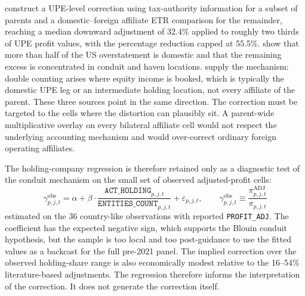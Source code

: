 \documentclass[11pt,a4paper]{article}
\newcommand{\code}[1]{\texttt{#1}}
\begin{document}
\citet{hugger2026} construct a UPE-level correction using tax-authority information for a subset of parents and a domestic--foreign affiliate ETR comparison for the remainder, reaching a median downward adjustment of 32.4\% applied to roughly two thirds of UPE profit values, with the percentage reduction capped at 55.5\%. \citet{garcia-bernardo2022a} show that more than half of the US overstatement is domestic and that the remaining excess is concentrated in conduit and haven locations. \citet{blouin2023} supply the mechanism: double counting arises where equity income is booked, which is typically the domestic UPE leg or an intermediate holding location, not every affiliate of the parent. These three sources point in the same direction. The correction must be targeted to the cells where the distortion can plausibly sit. A parent-wide multiplicative overlay on every bilateral affiliate cell would not respect the underlying accounting mechanism and would over-correct ordinary foreign operating affiliates.

The holding-company regression is therefore retained only as a diagnostic test of the conduit mechanism on the small set of observed adjusted-profit cells:
\begin{equation}\label{eq:correction_model}
\gamma_{p,j,t}^{\text{obs}} = \alpha + \beta \cdot \frac{\code{ACT\_HOLDING}_{p,j,t}}{\code{ENTITIES\_COUNT}_{p,j,t}} + \varepsilon_{p,j,t}, \qquad \gamma_{p,j,t}^{\text{obs}} \equiv \frac{\pi_{p,j,t}^{\text{ADJ}}}{\pi_{p,j,t}}
\end{equation}
estimated on the 36 country-like observations with reported \code{PROFIT\_ADJ}. The coefficient has the expected negative sign, which supports the Blouin conduit hypothesis, but the sample is too local and too post-guidance to use the fitted values as a backcast for the full pre-2021 panel. The implied correction over the observed holding-share range is also economically modest relative to the 16--54\% literature-based adjustments. The regression therefore informs the interpretation of the correction. It does not generate the correction itself.
\end{document}
